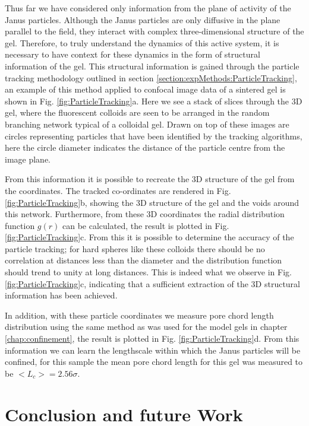 Thus far we have considered only information from the plane of activity of the Janus particles. Although the Janus particles are only diffusive in the plane parallel to the field, they interact with complex three-dimensional structure of the gel. Therefore, to truly understand the dynamics of this active system, it is necessary to have context for these dynamics in the form of structural information of the gel. This structural information is gained through the particle tracking methodology outlined in section \ref{section:expMethods:ParticleTracking}, an example of this method applied to confocal image data of a sintered gel is shown in Fig. \ref{fig:ParticleTracking}a. Here we see a stack of slices through the 3D gel, where the fluorescent colloids are seen to be arranged in the random branching network typical of a colloidal gel. Drawn on top of these images are circles representing particles that have been identified by the tracking algorithms, here the circle diameter indicates the distance of the particle centre from the image plane. 

From this information it is possible to recreate the 3D structure of the gel from the coordinates. The tracked co-ordinates are rendered in Fig. \ref{fig:ParticleTracking}b, showing the 3D structure of the gel and the voids around this network. Furthermore, from these 3D coordinates the radial distribution function $g(r)$ can be calculated, the result is plotted in Fig. \ref{fig:ParticleTracking}c. From this it is possible to determine the accuracy of the particle tracking; for hard spheres like these colloids there should be no correlation at distances less than the diameter and the distribution function should trend to unity at long distances. This is indeed what we observe in Fig. \ref{fig:ParticleTracking}c, indicating that a sufficient extraction of the 3D structural information has been achieved.

In addition, with these particle coordinates we measure pore chord length distribution using the same method as was used for the model gels in chapter \ref{chap:confinement}, the result is plotted in Fig. \ref{fig:ParticleTracking}d. From this information we can learn the lengthscale within which the Janus particles will be confined, for this sample the mean pore chord length for this gel was measured to be  $<L_c> = 2.56\sigma$.


\section{Conclusion and future Work}
\label{section:expSystem:Conclusion}


